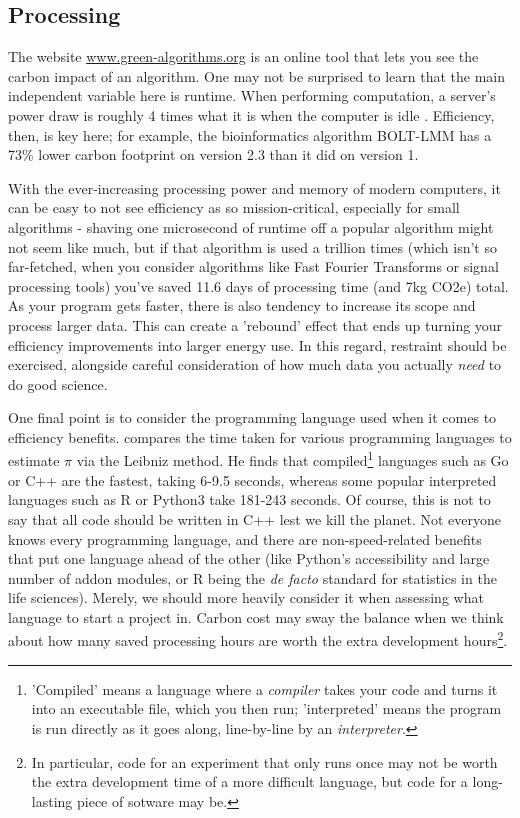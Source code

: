 \documentclass{article}
\begin{document}
\subsection{Processing}
The website \href{www.green-algorithms.org}{www.green-algorithms.org} \citep{lannelongue2021green} is an online tool that lets you see the carbon impact of an algorithm. One may not be surprised to learn that the main independent variable here is runtime. When performing computation, a server's power draw is roughly 4 times what it is when the computer is idle \citep{lannelongue2021ten}. Efficiency, then, is key here; for example, the bioinformatics algorithm BOLT-LMM has a 73\% lower carbon footprint on version 2.3 than it did on version 1.  \citep{grealey2021carbon} \newline

With the ever-increasing processing power and memory of modern computers, it can be easy to not see efficiency as so mission-critical, especially for small algorithms - shaving one microsecond of runtime off a popular algorithm might not seem like much, but if that algorithm is used a trillion times (which isn't so far-fetched, when you consider algorithms like Fast Fourier Transforms or signal processing tools) you've saved 11.6 days of processing time (and 7kg CO2e) total.  As your program gets faster, there is also tendency to increase its scope and process larger data. This can create a 'rebound' effect \citep{lannelongue2021ten} that ends up turning your efficiency improvements into larger energy use. In this regard, restraint should be exercised, alongside careful consideration of how much data you actually \emph{need} to do good science.\newline

One final point is to consider the programming language used when it comes to efficiency benefits. \citet{heer2018speed} compares the time taken for various programming languages to estimate $\pi$ via the Leibniz method. He finds that compiled\footnote{'Compiled' means a language where a \emph{compiler} takes your code and turns it into an executable file, which you then run; 'interpreted' means the program is run directly as it goes along, line-by-line by an \emph{interpreter}.} languages such as Go or C++ are the fastest, taking 6-9.5 seconds, whereas some popular interpreted languages such as R or Python3 take 181-243 seconds. Of course, this is not to say that all code should be written in C++ lest we kill the planet. Not everyone knows every programming language, and there are non-speed-related benefits that put one language ahead of the other (like Python's accessibility and large number of addon modules, or R being the \textit{de facto} standard for statistics in the life sciences). Merely, we should more heavily consider it when assessing what language to start a project in. Carbon cost may sway the balance when we think about how many saved processing hours are worth the extra development hours\footnote{In particular, code for an experiment that only runs once may not be worth the extra development time of a more difficult language, but code for a long-lasting piece of sotware may be.}. \newline
\end{document}
